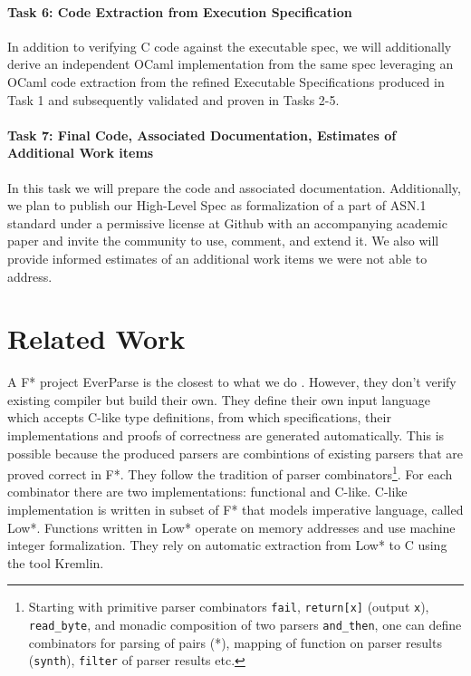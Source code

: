 \documentclass[acmsmall,nonacm]{acmart}
\begin{document}
\paragraph{Task 6: Code Extraction from Execution Specification}
In addition to verifying C code against the executable spec, we will additionally derive an independent OCaml implementation from the same spec leveraging an OCaml code extraction from the refined Executable Specifications produced in Task 1 and subsequently validated and proven in Tasks 2-5. 

\paragraph{Task 7: Final Code, Associated Documentation, Estimates of Additional Work items}
In this task we will prepare the code and associated documentation. Additionally, we plan to publish our High-Level Spec as formalization of a part of ASN.1 standard under a permissive license at Github with an accompanying academic paper and invite the community to use, comment, and extend it. 
We also will provide informed estimates of an additional work items we were not able to address. 

\section{Related Work}

A F* project EverParse is the closest to what we do \cite{RamananandroDFS19}. However, they
don't verify existing compiler but build their own. They define their
own input language which accepts C-like type definitions, from which
specifications, their implementations and proofs of correctness are
generated automatically. This is possible because the produced parsers
are combintions of existing parsers that are proved correct in F*. They
follow the tradition of parser combinators\footnote{Starting with
  primitive parser combinators  \texttt{fail},  \texttt{return[x]} (output  \texttt{x}),
  \texttt{read\_byte}, and monadic composition of two parsers
   \texttt{and\_then}, one can define combinators for parsing of pairs
  (*), mapping of function on parser results (\texttt{synth}),  \texttt{filter} of parser
  results etc.}. For each combinator there are two implementations:
functional and C-like. C-like implementation is written in subset of
F* that models imperative language, called Low*. Functions written in
Low* operate on memory addresses and use machine integer
formalization. They rely on automatic extraction from Low* to C using
the tool Kremlin.
\end{document}
